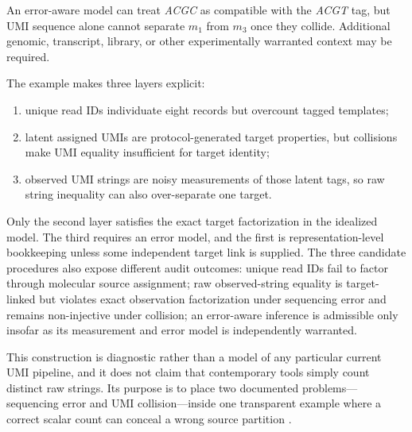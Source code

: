\documentclass[11pt]{article}
\begin{document}
An error-aware model can treat \emph{ACGC} as compatible with the \emph{ACGT} tag, but UMI sequence alone cannot separate \(m_1\) from \(m_3\) once they collide. Additional genomic, transcript, library, or other experimentally warranted context may be required.

The example makes three layers explicit:

\begin{enumerate}[leftmargin=*]
\item unique read IDs individuate eight records but overcount tagged templates;
\item latent assigned UMIs are protocol-generated target properties, but collisions make UMI equality insufficient for target identity;
\item observed UMI strings are noisy measurements of those latent tags, so raw string inequality can also over-separate one target.
\end{enumerate}

Only the second layer satisfies the exact target factorization in the idealized model. The third requires an error model, and the first is representation-level bookkeeping unless some independent target link is supplied. The three candidate procedures also expose different audit outcomes: unique read IDs fail to factor through molecular source assignment; raw observed-string equality is target-linked but violates exact observation factorization under sequencing error and remains non-injective under collision; an error-aware inference is admissible only insofar as its measurement and error model is independently warranted.

This construction is diagnostic rather than a model of any particular current UMI pipeline, and it does not claim that contemporary tools simply count distinct raw strings. Its purpose is to place two documented problems---sequencing error and UMI collision---inside one transparent example where a correct scalar count can conceal a wrong source partition \citep{Kivioja2012UMI,SmithHegerSudbery2017UMITools}.
\end{document}
